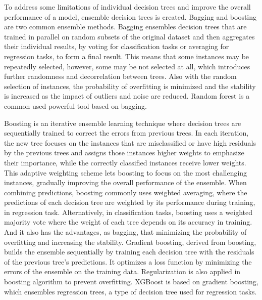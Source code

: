 \documentclass[12pt,a4paper,english
]{tunithesis}
\begin{document}
To address some limitations of individual decision trees and improve the overall performance of a model, ensemble decision trees is created. Bagging and boosting are two common ensemble methods. Bagging ensembles decision trees that are trained in parallel on random subsets of the original dataset and then aggregates their individual results, by voting for classification tasks or averaging for regression tasks, to form a final result. This means that some instances may be repeatedly selected, however, some may be not selected at all, which introduces further randomness and decorrelation between trees. Also with the random selection of instances, the probability of overfitting is minimized and the stability is increased as the impact of outliers and noise are reduced. Random forest is a common used powerful tool based on bagging.

Boosting is an iterative ensemble learning technique where decision trees are sequentially trained to correct the errors from previous trees. In each iteration, the new tree focuses on the instances that are misclassified or have high residuals by the previous trees and assigns those instances higher weights to emphasize their importance, while the correctly classified instances receive lower weights. This adaptive weighting scheme lets boosting to focus on the most challenging instances, gradually improving the overall performance of the ensemble. When combining predictions, boosting commonly uses weighted averaging, where the predictions of each decision tree are weighted by its performance during training, in regression task. Alternatively, in classification tasks, boosting uses a weighted majority vote where the weight of each tree depends on its accuracy in training. And it also has the advantages, as bagging, that minimizing the probability of overfitting and increasing the stability. Gradient boosting, derived from boosting, builds the ensemble sequentially by training each decision tree with the residuals of the previous tree's predictions. It optimizes a loss function by minimizing the errors of the ensemble on the training data. Regularization is also applied in boosting algorithm to prevent overfitting. XGBoost is based on gradient boosting, which ensembles regression trees, a type of decision tree used for regression tasks.
\end{document}
